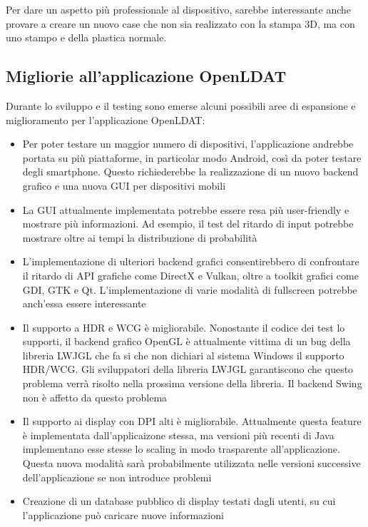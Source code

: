 Per dare un aspetto più professionale al dispositivo, sarebbe interessante anche provare a creare un nuovo case che non sia realizzato con la stampa 3D, ma con uno stampo e della plastica normale.

\subsection{Migliorie all'applicazione OpenLDAT}
Durante lo sviluppo e il testing sono emerse alcuni possibili aree di espansione e miglioramento per l'applicazione OpenLDAT:\begin{itemize}
	\item Per poter testare un maggior numero di dispositivi, l'applicazione andrebbe portata su più piattaforme, in particolar modo Android, così da poter testare degli smartphone. Questo richiederebbe la realizzazione di un nuovo backend grafico e una nuova GUI per dispositivi mobili
	\item La GUI attualmente implementata potrebbe essere resa più user-friendly e mostrare più informazioni. Ad esempio, il test del ritardo di input potrebbe mostrare oltre ai tempi la distribuzione di probabilità
	\item L'implementazione di ulteriori backend grafici consentirebbero di confrontare il ritardo di API grafiche come DirectX e Vulkan, oltre a toolkit grafici come GDI, GTK e Qt. L'implementazione di varie modalità di fullscreen potrebbe anch'essa essere interessante
	\item Il supporto a HDR e WCG è migliorabile. Nonostante il codice dei test lo supporti, il backend grafico OpenGL è attualmente vittima di un bug della libreria LWJGL che fa si che non dichiari al sistema Windows il supporto HDR/WCG. Gli sviluppatori della libreria LWJGL garantiscono che questo problema verrà risolto nella prossima versione della libreria. Il backend Swing non è affetto da questo problema
	\item Il supporto ai display con DPI alti è migliorabile. Attualmente questa feature è implementata dall'applicaizone stessa, ma versioni più recenti di Java implementano esse stesse lo scaling in modo trasparente all'applicazione. Questa nuova modalità sarà probabilmente utilizzata nelle versioni successive dell'applicazione se non introduce problemi
	\item Creazione di un database pubblico di display testati dagli utenti, su cui l'applicazione può caricare nuove informazioni
\end{itemize}

